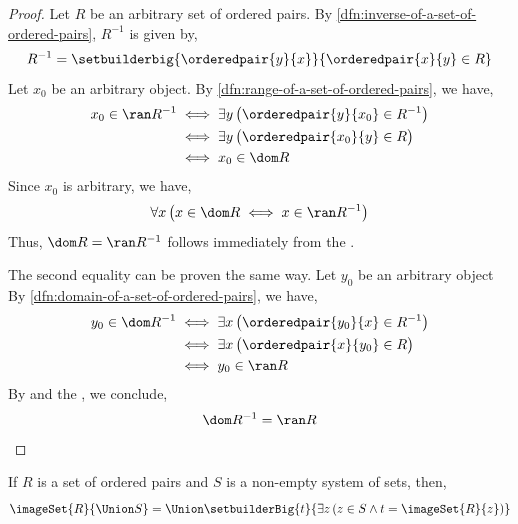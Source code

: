 \begin{proof}
    Let \( R \) be an arbitrary set of ordered pairs. By \cref{dfn:inverse-of-a-set-of-ordered-pairs}, \( R^{-1} \)
    is given by,
    \begin{equation*}
        R^{-1} = \setbuilderbig{\orderedpair{y}{x}}{\orderedpair{x}{y} \in R}
    \end{equation*}
    Let \( x_{0} \) be an arbitrary object. By \cref{dfn:range-of-a-set-of-ordered-pairs}, we have,
    \begin{align*}
        x_{0} \in \ran R^{-1}
        &\iff
        \exists y \, \big( \orderedpair{y}{x_{0}} \in R^{-1} \big)\\
        &\iff
        \exists y \, \big( \orderedpair{x_{0}}{y} \in R \big)\\
        &\iff
        x_{0} \in \dom R
    \end{align*}
    Since \( x_{0} \) is arbitrary, we have,
    \begin{equation*}
        \forall x \, \mleft( x \in \dom R \iff x \in \ran R^{-1} \mright)
    \end{equation*}
    Thus, \( \dom R = \ran R^{-1} \) follows immediately from the .

    \vspace{0.3cm}
    \noindent
    The second equality can be proven the same way. Let \( y_{0} \) be an arbitrary object
    By \cref{dfn:domain-of-a-set-of-ordered-pairs}, we have,
    \begin{align*}
        y_{0} \in \dom R^{-1}
        &\iff
        \exists x \, \big( \orderedpair{y_{0}}{x} \in R^{-1} \big)\\
        &\iff
        \exists x \, \big( \orderedpair{x}{y_{0}} \in R \big)\\
        &\iff
        y_{0} \in \ran R
    \end{align*}
    By  and the , we conclude,
    \begin{equation*}
        \dom R^{-1} = \ran R \qedhere
    \end{equation*}
\end{proof}

\begin{thm}
    \label{thm:image-under-a-union-is-equal-to-the-union-of-individual-images}
    If \( R \) is a set of ordered pairs and \( S \) is a non-empty system of sets, then,
    \begin{equation*}
        \imageSet{R}{\Union S} = \Union \setbuilderBig{t}{\exists z \, \mleft( z \in S \land t = \imageSet{R}{z} \mright)}
    \end{equation*}
\end{thm}

